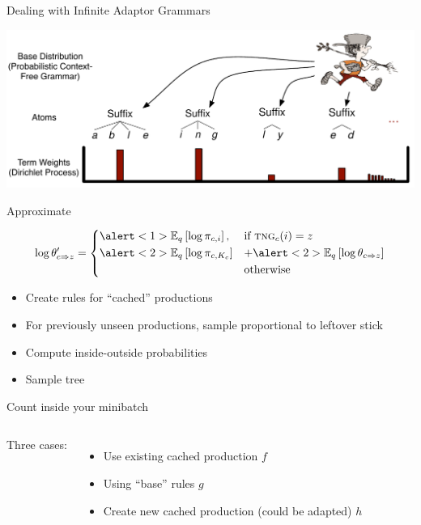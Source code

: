 \begin{frame}{Dealing with Infinite Adaptor Grammars}
  \begin{center}
      \includegraphics[width=.9\linewidth]{onlineag/dp_johnny}

  \end{center}

\end{frame}

\begin{frame}{Approximate }

\begin{align}
   \log \theta'_{c \Rightarrow z} =
  \begin{dcases}
     \alert<1>{\e{q}{ \log \pi_{c, i} },} & \mbox{if $\tng{c}(i) = z$}  \\
     \alert<2> {\e{q}{\log \pi_{c, K_c}}} & + \alert<2>{\e{q}{\log \theta_{c \Rightarrow z} } } \\
    & \mbox{otherwise}
  \end{dcases}
  \label{eq:approx-pcfg}
\end{align}

\begin{itemize}
  \item \alert<1>{Create rules for ``cached'' productions}
  \item \alert<2>{For previously unseen productions, sample
      proportional to leftover stick}
  \item Compute inside-outside probabilities
  \item Sample tree~\cite{johnson-07}
\end{itemize}

\end{frame}


\begin{frame}{Count inside your minibatch}

  \begin{columns}

    Three cases:
    \begin{itemize}
      \item Use existing cached production $f$
      \item Using ``base''  rules $g$
      \item Create new cached production (could be adapted) $h$
    \end{itemize}
    \end{columns}

\end{frame}


